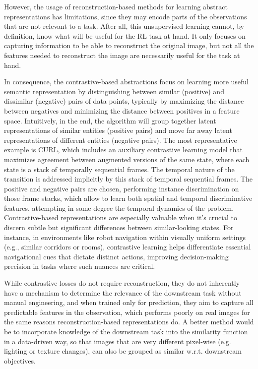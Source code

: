 However, the usage of reconstruction-based methods for learning abstract representations has limitations, since they may encode parts of the observations that are not relevant to a task. After all, this unsupervised learning cannot, by definition, know what will be useful for the RL task at hand. It only focuses on capturing information to be able to reconstruct the original image, but not all the features needed to reconstruct the image are necessarily useful for the task at hand.

In consequence, the contrastive-based abstractions focus on learning more useful semantic representation by distinguishing between similar (positive) and dissimilar (negative) pairs of data points, typically by maximizing the distance between negatives and minimizing the distance between positives in a feature space. Intuitively, in the end, the algorithm will group together latent representations of similar entities (positive pairs) and move far away latent representations of different entities (negative pairs). The most representative example is CURL, which includes an auxiliary contrastive learning model that maximizes agreement between augmented versions of the same state, where each state is a stack of temporally sequential frames. The temporal nature of the transition is addressed implicitly by this stack of temporal sequential frames. The positive and negative pairs are chosen, performing instance discrimination on those frame stacks, which allow to learn both spatial and temporal discriminative features, attempting in some degree the temporal dynamics of the problem. Contrastive-based representations are especially valuable when it's crucial to discern subtle but significant differences between similar-looking states. For instance, in environments like robot navigation within visually uniform settings (e.g., similar corridors or rooms), contrastive learning helps differentiate essential navigational cues that dictate distinct actions, improving decision-making precision in tasks where such nuances are critical.

While contrastive losses do not require reconstruction, they do not inherently have a mechanism to determine the relevance of the downstream task without manual engineering, and when trained only for prediction, they aim to capture all predictable features in the observation, which performs poorly on real images for the same reasons reconstruction-based representations do. A better method would be to incorporate knowledge of the downstream task into the similarity function in a data-driven way, so that images that are very different pixel-wise (e.g. lighting or texture changes), can also be grouped as similar w.r.t. downstream objectives. 

